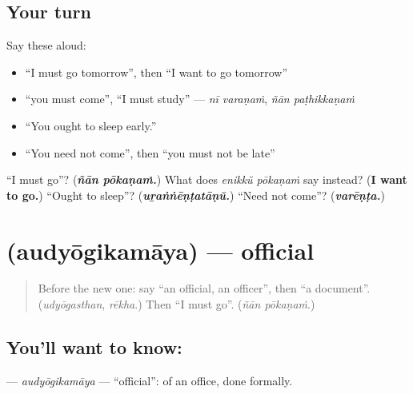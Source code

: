 \subsection*{Your turn}
Say these aloud:

\begin{itemize}
\raggedright
  \item \textquotedblleft{}I must go tomorrow\textquotedblright{}, then \textquotedblleft{}I want to go tomorrow\textquotedblright{}
  \item \textquotedblleft{}you must come\textquotedblright{}, \textquotedblleft{}I must study\textquotedblright{} — \emph{nī varaṇaṁ}, \emph{ñān paṭhikkaṇaṁ}
  \item \textquotedblleft{}You ought to sleep early.\textquotedblright{}
  \item \textquotedblleft{}You need not come\textquotedblright{}, then \textquotedblleft{}you must not be late\textquotedblright{}
\end{itemize}

\begin{tcolorbox}[breakable,colback=teal!4,colframe=teal!35!black,title={Before you move on}]
\textquotedblleft{}I must go\textquotedblright{}? (\emph{\textbf{ñān pōkaṇaṁ.}}) What does \emph{enikkŭ pōkaṇaṁ} say instead? (\textbf{I want to go.}) \textquotedblleft{}Ought to sleep\textquotedblright{}? (\emph{\textbf{uṟaṅṅēṇṭatāṇŭ.}}) \textquotedblleft{}Need not come\textquotedblright{}? (\emph{\textbf{varēṇṭa.}})
\end{tcolorbox}
\section[\texorpdfstring{\ml{ഔദ്യോഗികമായ} (audyōgikamāya)}{ഔദ്യോഗികമായ (audyōgikamāya)}]{ (audyōgikamāya) — official}

\label{lesson:ML-C342-audyogikamaya}



\begin{quote}
Before the new one: say \textquotedblleft{}an official, an officer\textquotedblright{}, then \textquotedblleft{}a document\textquotedblright{}. (\emph{udyōgasthan}, \emph{rēkha}.) Then \textquotedblleft{}I must go\textquotedblright{}. (\emph{ñān pōkaṇaṁ}.)
\end{quote}

\subsection*{You'll want to know: }
\textbf{} — \emph{audyōgikamāya} — \textquotedblleft{}official\textquotedblright{}: of an office, done formally.

